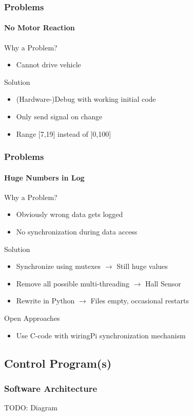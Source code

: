 \documentclass[8pt]{beamer}
\begin{document}
\begin{frame}
	\frametitle{Problems}
	\framesubtitle{No Motor Reaction}
	\begin{block}{Why a Problem?}
		\begin{itemize}
			\item Cannot drive vehicle
		\end{itemize}
	\end{block}
	\begin{block}{Solution}
		\begin{itemize}
			\item (Hardware-)Debug with working initial code
			\item Only send signal on change
			\item Range [7,19] instead of [0,100]
		\end{itemize}
	\end{block}	
\end{frame}

\begin{frame}
	\frametitle{Problems}
	\framesubtitle{Huge Numbers in Log}
	\begin{block}{Why a Problem?}
		\begin{itemize}
			\item Obviously wrong data gets logged
			\item No synchronization during data access
		\end{itemize}
	\end{block}
	\pause
	\begin{block}{Solution}
		\begin{itemize}[<+->]
			\item Synchronize using mutexes $\rightarrow$ Still huge values
			\item Remove all possible multi-threading $\rightarrow$ Hall Sensor
			\item Rewrite in Python $\rightarrow$ Files empty, occasional restarts
		\end{itemize}
	\end{block}	
	\pause
	\begin{block}{Open Approaches}
		\begin{itemize}
			\item Use C-code with wiringPi synchronization mechanism
		\end{itemize}
	\end{block}
\end{frame}

\subsection{Control Program(s)}
\begin{frame}
	\frametitle{Software Architecture}
	TODO: Diagram
\end{frame}
\end{document}
